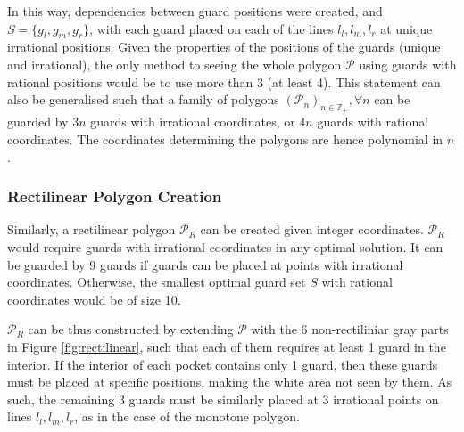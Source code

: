 In this way, dependencies between guard positions were created, and $S = \{g_l, g_m, g_r\}$, with each guard placed on each of the lines $l_l, l_m, l_r$ at unique irrational positions. Given the properties of the positions of the guards (unique and irrational), the only method to seeing the whole polygon $\mathcal P$ using guards with rational positions would be to use more than 3 (at least 4). This statement can also be generalised such that a family of polygons $(\mathcal{P}_n)_{n \in \mathbb{Z}_+}, \forall n$ can be guarded by $3n$ guards with irrational coordinates, or $4n$ guards with rational coordinates. The coordinates determining the polygons are hence polynomial in $n$.

\subsubsection{Rectilinear Polygon Creation}
Similarly, a rectilinear polygon $\mathcal P_R$ can be created given integer coordinates. $\mathcal P_R$ would require guards with irrational coordinates in any optimal solution. It can be guarded by 9 guards if guards can be placed at points with irrational coordinates. Otherwise, the smallest optimal guard set $S$ with rational coordinates would be of size 10.

$\mathcal P_R$ can be thus constructed by extending $\mathcal P$ with the 6 non-rectiliniar gray parts in Figure \ref{fig:rectilinear}, such that each of them requires at least 1 guard in the interior. If the interior of each pocket contains only 1 guard, then these guards must be placed at specific positions, making the white area not seen by them. As such, the remaining 3 guards must be similarly placed at 3 irrational points on lines $l_l, l_m, l_r$, as in the case of the monotone polygon.

